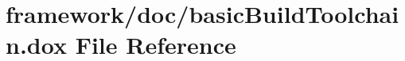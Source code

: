 \hypertarget{basic_build_toolchain_8dox}{}\section{framework/doc/basic\+Build\+Toolchain.dox File Reference}
\label{basic_build_toolchain_8dox}
